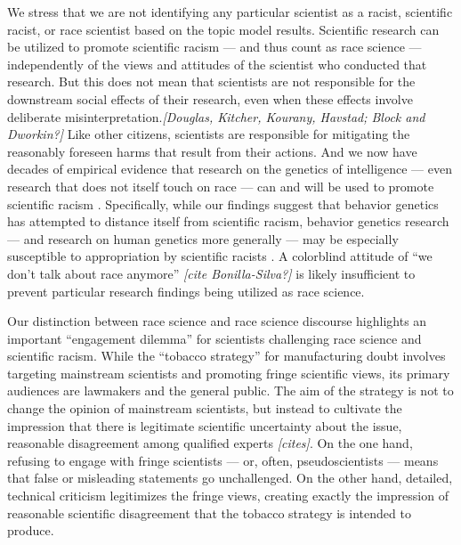 \documentclass[12pt]{article}
\begin{document}
We stress that we are not identifying any particular scientist as a racist, scientific racist, or race scientist based on the topic model results. Scientific research can be utilized to promote scientific racism --- and thus count as race science --- independently of the views and attitudes of the scientist who conducted that research.\cite{TaberyWhyStudyingGenetics2015, GillbornSoftlySoftlyGenetics2016, CarlsonQuantifyingContextualizingImpact2020, HennWhyDNANo2021} But this does not mean that scientists are not responsible for the downstream social effects of their
research, even when these effects involve deliberate misinterpretation.\emph{{[}Douglas, Kitcher, Kourany, Havstad; Block and Dworkin?{]}} Like other citizens, scientists are responsible for mitigating the reasonably foreseen harms that result from their actions. And we now have decades of empirical evidence that research on the genetics of intelligence --- even research that does not itself touch on race --- can and will be used to promote scientific racism \cite{MeyerWrestlingSocialBehavioral2023}. Specifically, while our findings suggest that behavior genetics has attempted to distance itself from scientific racism, behavior genetics research --- and research on human genetics more generally --- may be especially susceptible to appropriation by scientific racists \cite{CarlsonQuantifyingContextualizingImpact2020, OgbunugaforDNABasketballBirthday2022}. A colorblind attitude of ``we don't talk about race anymore'' \emph{{[}cite Bonilla-Silva?{]}} is likely insufficient to prevent particular research findings being utilized as race science.

Our distinction between race science and race science discourse highlights an important ``engagement dilemma'' for scientists challenging race science and scientific racism. While the ``tobacco strategy'' for manufacturing doubt involves targeting mainstream scientists and promoting fringe scientific views, its primary audiences are lawmakers and the general public. The aim of the strategy is not to change the opinion of mainstream scientists, but instead to cultivate the impression that there is legitimate scientific uncertainty about the issue, reasonable disagreement among qualified experts \emph{{[}cites{]}}. On the one hand, refusing to engage with fringe scientists --- or, often, pseudoscientists \cite{BhakthavatsalamVirtueEpistemologicalApproach2021} --- means that false or misleading statements go unchallenged. On the other hand, detailed, technical criticism legitimizes the fringe views, creating exactly the impression of reasonable scientific disagreement that the tobacco strategy is intended to produce.
\end{document}
